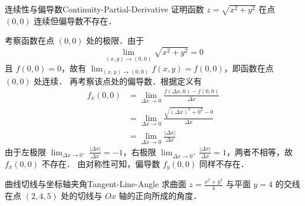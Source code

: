 \begin{problem}{连续性与偏导数}{Continuity-Partial-Derivative}
    证明函数 $z = \sqrt{x^2 + y^2}$ 在点 $(0,0)$ 连续但偏导数不存在．
\end{problem}

\begin{myproof}
    考察函数在点 $(0,0)$ 处的极限．由于
    \begin{equation}
        \lim_{(x,y) \to (0,0)} \sqrt{x^2 + y^2} = 0
    \end{equation}
    且 $f(0,0) = 0$，故有 $\lim_{(x,y) \to (0,0)} f(x,y) = f(0,0)$，即函数在点 $(0,0)$ 处连续．
    再考察该点处的偏导数．根据定义有
    \begin{equation}
        \begin{aligned}
            f_x(0,0) & = \lim_{\Delta x \to 0} \frac{f(\Delta x, 0) - f(0,0)}{\Delta x}       \\
                     & = \lim_{\Delta x \to 0} \frac{\sqrt{(\Delta x)^2 + 0^2} - 0}{\Delta x} \\
                     & = \lim_{\Delta x \to 0} \frac{|\Delta x|}{\Delta x}
        \end{aligned}
    \end{equation}
    由于左极限 $\lim_{\Delta x \to 0^-} \frac{|\Delta x|}{\Delta x} = -1$，右极限 $\lim_{\Delta x \to 0^+} \frac{|\Delta x|}{\Delta x} = 1$，两者不相等，故 $f_x(0,0)$ 不存在．
    由对称性可知，偏导数 $f_y(0,0)$ 同样不存在．
\end{myproof}

\begin{problem}{曲线切线与坐标轴夹角}{Tangent-Line-Angle}
    求曲面 $z = \frac{x^2+y^2}{4}$ 与平面 $y = 4$ 的交线在点 $(2, 4, 5)$ 处的切线与 $Ox$ 轴的正向所成的角度．
\end{problem}

